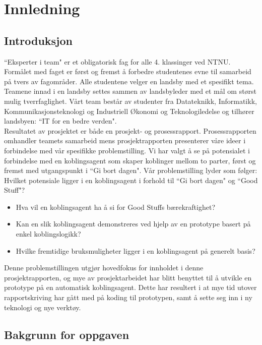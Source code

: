 \section{Innledning}
\subsection{Introduksjon}

``Eksperter i team" er et obligatorisk fag for alle 4. klassinger ved NTNU. Formålet med faget er først og fremst å forbedre studentenes evne til samarbeid på tvers av fagområder. Alle studentene velger en landsby med et spesifikt tema. Teamene innad i en landsby settes sammen av landsbyleder med et mål om størst mulig tverrfaglighet. Vårt team består av studenter fra Datateknikk, Informatikk, Kommunikasjonsteknologi og Industriell Økonomi og Teknologiledelse og tilhører landsbyen: ``IT for en bedre verden".\\

Resultatet av prosjektet er både en prosjekt- og prosessrapport. Prosessrapporten omhandler teamets samarbeid mens prosjektrapporten presenterer våre ideer i forbindelse med vår spesifikke problemstilling. Vi har valgt å se på potensialet i forbindelse med en koblingsagent som skaper koblinger mellom to parter, først og fremst med utgangspunkt i ``Gi bort dagen". Vår problemstilling lyder som følger:
Hvilket potensiale ligger i en koblingsagent i forhold til ``Gi bort dagen" og ``Good Stuff"?

\begin{itemize}
  \item Hva vil en koblingsagent ha å si for Good Stuffs bærekraftighet?
  \item Kan en slik koblingsagent demonstreres ved hjelp av en prototype basert på enkel koblingslogikk?
  \item Hvilke fremtidige bruksmuligheter ligger i en koblingsagent på generelt basis?
\end{itemize}

Denne problemstillingen utgjør hovedfokus for innholdet i denne prosjektrapporten, og mye av prosjektarbeidet har blitt benyttet til å utvikle en prototype på en automatisk koblingsagent. Dette har resultert i at mye tid utover rapportskriving har gått med på koding til prototypen, samt å sette seg inn i ny teknologi og nye verktøy.

\subsection{Bakgrunn for oppgaven}

